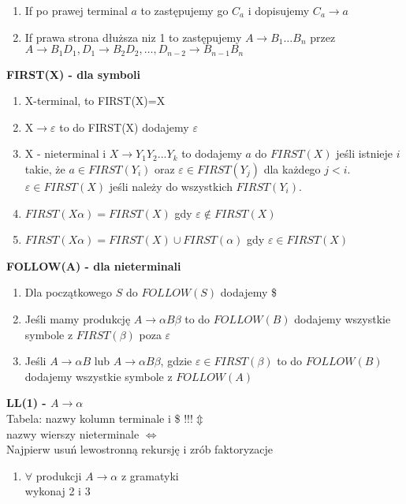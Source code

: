 \begin{multicols}{3}
\begin{enumerate}
      \item If po prawej terminal $a$ to zastępujemy go $C_{a}$ i dopisujemy $C_{a} \rightarrow a$
      \item If prawa strona dłuższa niz 1 to zastępujemy $A \rightarrow B_{1} \ldots B_{n}$ przez \\
    $A \rightarrow B_{1}D_{1}, D_{1} \rightarrow B_{2}D_{2}, \ldots ,D_{n-2} \rightarrow B_{n-1}B_{n}$
    \end{enumerate}
    \textbf{FIRST(X) - dla symboli}
    \begin{enumerate}
      \item X-terminal, to FIRST(X)={X}
      \item X$\rightarrow \varepsilon$ to do FIRST(X) dodajemy $\varepsilon$
      \item X - nieterminal i $X \rightarrow Y_{1}Y_{2}...Y_{k}$ to dodajemy $a$ do $FIRST(X)$ jeśli istnieje $i$ takie, że $a \in FIRST(Y_{i})$ oraz $\varepsilon \in FIRST(Y_{j})$ dla każdego $j<i$. \\ $\varepsilon \in FIRST(X)$ jeśli należy do wszystkich $FIRST(Y_{i})$. 
      \item $FIRST(X\alpha) = FIRST(X)$ gdy $\varepsilon \notin FIRST(X)$
      \item $FIRST(X\alpha) = FIRST(X) \cup FIRST(\alpha)$ gdy $\varepsilon \in FIRST(X)$
    \end{enumerate}
    \textbf{FOLLOW(A) - dla nieterminali}
    \begin{enumerate}
      \item Dla początkowego $S$ do $FOLLOW(S)$ dodajemy \$
      \item Jeśli mamy produkcję $A\rightarrow\alpha B \beta$ to do $FOLLOW(B)$ dodajemy wszystkie symbole z $FIRST(\beta)$ poza $\varepsilon$
      \item Jeśli $A\rightarrow\alpha B $ lub $A\rightarrow\alpha B \beta$, gdzie $\varepsilon \in FIRST(\beta)$ to do $FOLLOW(B)$ dodajemy wszystkie symbole z $FOLLOW(A)$
    \end{enumerate}
    \textbf{LL(1) - $A \rightarrow \alpha$} \\
    Tabela: nazwy kolumn terminale i \$ !!!$ \Updownarrow $ \\ nazwy wierszy nieterminale $ \Leftrightarrow $ \\
    Najpierw usuń lewostronną rekursję i zrób faktoryzacje
    \begin{enumerate}
      \item $\forall$ produkcji $A\rightarrow \alpha$  z gramatyki \\ wykonaj 2 i 3

\end{enumerate}
\end{multicols}
